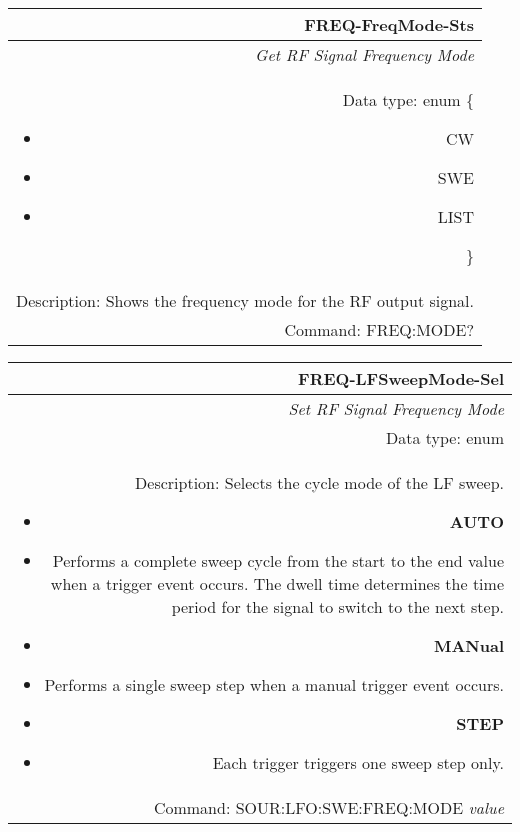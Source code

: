 \documentclass[openany]{article}
\begin{document}
		\begin{tabular}{N}
			\hline
			\bfseries FREQ-FreqMode-Sts \\ \hline
			\emph{Get RF Signal Frequency Mode} \\
			Data type: enum \{\begin{itemize}[noitemsep]
				\small
				\item[] CW
				\item[] SWE
				\item[] LIST
			\end{itemize}\} \\ 
			Description: Shows the frequency mode for the RF output signal. \\
			Command: FREQ:MODE? \\

		\end{tabular}
%
		\begin{tabular}{N}
			\hline
			\bfseries FREQ-LFSweepMode-Sel \\ \hline
			\emph{Set RF Signal Frequency Mode} \\
			Data type: enum \\
			Description: Selects the cycle mode of the LF sweep.\begin{itemize}[noitemsep]
				\small
				\item[] \textbf{AUTO} 
				\item[] Performs a complete sweep cycle from the start to the end value when a trigger event occurs. The dwell time determines the time period for the signal to switch to the next step.
				\item[] \textbf{MANual}
				\item[] Performs a single sweep step when a manual trigger event occurs.
				\item[] \textbf{STEP}
				\item[] Each trigger triggers one sweep step only.
			\end{itemize} \\
			Command: SOUR:LFO:SWE:FREQ:MODE \emph{value} \\

		\end{tabular}
\end{document}
